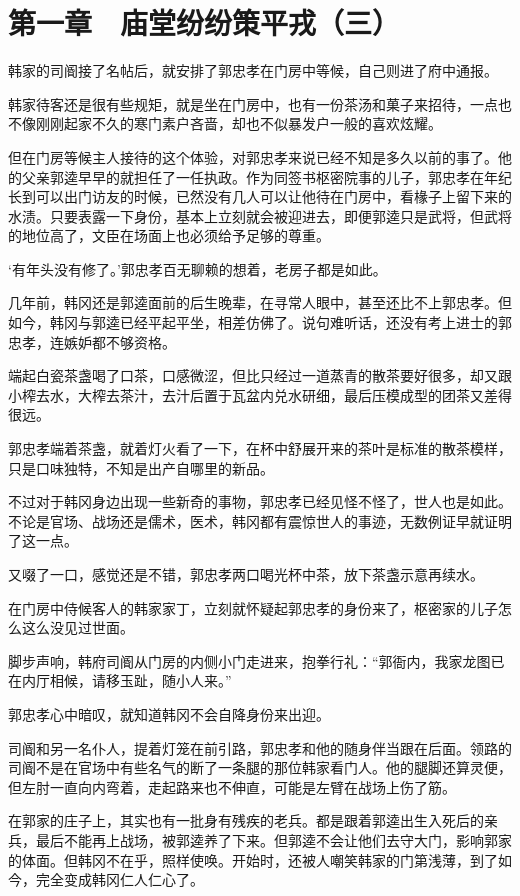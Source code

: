 \section{第一章　庙堂纷纷策平戎（三）}

韩家的司阍接了名帖后，就安排了郭忠孝在门房中等候，自己则进了府中通报。

韩家待客还是很有些规矩，就是坐在门房中，也有一份茶汤和菓子来招待，一点也不像刚刚起家不久的寒门素户吝啬，却也不似暴发户一般的喜欢炫耀。

但在门房等候主人接待的这个体验，对郭忠孝来说已经不知是多久以前的事了。他的父亲郭逵早早的就担任了一任执政。作为同签书枢密院事的儿子，郭忠孝在年纪长到可以出门访友的时候，已然没有几人可以让他待在门房中，看椽子上留下来的水渍。只要表露一下身份，基本上立刻就会被迎进去，即便郭逵只是武将，但武将的地位高了，文臣在场面上也必须给予足够的尊重。

‘有年头没有修了。’郭忠孝百无聊赖的想着，老房子都是如此。

几年前，韩冈还是郭逵面前的后生晚辈，在寻常人眼中，甚至还比不上郭忠孝。但如今，韩冈与郭逵已经平起平坐，相差仿佛了。说句难听话，还没有考上进士的郭忠孝，连嫉妒都不够资格。

端起白瓷茶盏喝了口茶，口感微涩，但比只经过一道蒸青的散茶要好很多，却又跟小榨去水，大榨去茶汁，去汁后置于瓦盆内兑水研细，最后压模成型的团茶又差得很远。

郭忠孝端着茶盏，就着灯火看了一下，在杯中舒展开来的茶叶是标准的散茶模样，只是口味独特，不知是出产自哪里的新品。

不过对于韩冈身边出现一些新奇的事物，郭忠孝已经见怪不怪了，世人也是如此。不论是官场、战场还是儒术，医术，韩冈都有震惊世人的事迹，无数例证早就证明了这一点。

又啜了一口，感觉还是不错，郭忠孝两口喝光杯中茶，放下茶盏示意再续水。

在门房中侍候客人的韩家家丁，立刻就怀疑起郭忠孝的身份来了，枢密家的儿子怎么这么没见过世面。

脚步声响，韩府司阍从门房的内侧小门走进来，抱拳行礼：“郭衙内，我家龙图已在内厅相候，请移玉趾，随小人来。”

郭忠孝心中暗叹，就知道韩冈不会自降身份来出迎。

司阍和另一名仆人，提着灯笼在前引路，郭忠孝和他的随身伴当跟在后面。领路的司阍不是在官场中有些名气的断了一条腿的那位韩家看门人。他的腿脚还算灵便，但左肘一直向内弯着，走起路来也不伸直，可能是左臂在战场上伤了筋。

在郭家的庄子上，其实也有一批身有残疾的老兵。都是跟着郭逵出生入死后的亲兵，最后不能再上战场，被郭逵养了下来。但郭逵不会让他们去守大门，影响郭家的体面。但韩冈不在乎，照样使唤。开始时，还被人嘲笑韩家的门第浅薄，到了如今，完全变成韩冈仁人仁心了。

